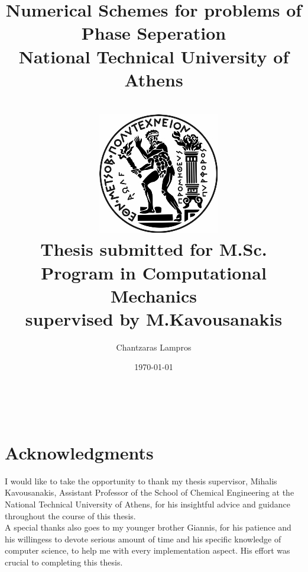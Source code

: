 \documentclass{article}
\begin{document}
\newpage

\title{		
{Numerical Schemes for problems of Phase Seperation}\\ 

		{\small National Technical University of Athens} \\~\\\
		{\includegraphics{ntua.jpg}}\\
		{\small Thesis submitted for M.Sc. Program in Computational Mechanics}\\ 
		{\small supervised by M.Kavousanakis} 
	  }
	  
\author{Chantzaras Lampros}
\date{\today}
\maketitle




\newpage 

\ %

\newpage

\section*{Acknowledgments}

I would like to take the opportunity to thank my thesis supervisor, Mihalis Kavousanakis,
Assistant Professor of the School of Chemical Engineering at the National Technical University
of Athens, for his insightful advice and guidance throughout the course of this thesis.\\

A special thanks also goes to my younger brother Giannis, for his patience and his willingess to devote serious amount of time and his specific knowledge of computer science, to help me with every implementation aspect. His effort was crucial to completing this thesis.\\
\end{document}
